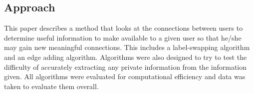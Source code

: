 \subsection{Approach}

\indent This paper describes a method that looks at the connections between users to determine useful information to make available to a given user so that he/she may gain new meaningful connections. This includes a label-swapping algorithm and an edge adding algorithm. Algorithms were also designed to try to test the difficulty of accurately extracting any private information from the information given. All algorithms were evaluated for computational efficiency and data was taken to evaluate them overall.  \\
